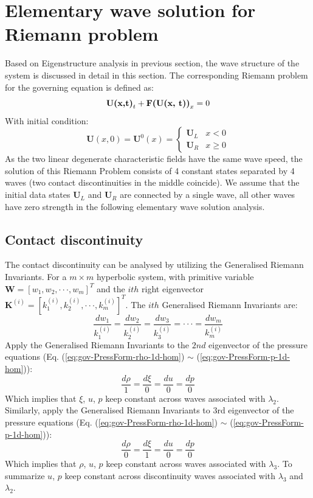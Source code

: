 \section{Elementary wave solution for Riemann problem}
Based on Eigenstructure analysis in previous section, the wave structure of the system is discussed in detail in this section. 
The corresponding Riemann problem for the governing equation is defined as: 
\begin{equation}
\textbf{U(x,t)}_t + \textbf{F(\textbf{U}(x, t))}_x = 0
\end{equation}
With initial condition: 
\begin{equation}
\textbf{U}(x, 0) = \textbf{U}^0(x) = \begin{cases} 
      \textbf{U}_L & x< 0\\
      \textbf{U}_R & x\geq 0
\end{cases}
\end{equation}
As the two linear degenerate characteristic fields have the same wave speed, the solution of this Riemann Problem consists of 4 constant states separated by 4 waves (two contact discontinuities in the middle coincide). 
We assume that the initial data states $\textbf{U}_L$ and $\textbf{U}_R$ are connected by a single wave, all other waves have zero strength in the following elementary wave solution analysis.

\subsection{Contact discontinuity}
The contact discontinuity can be analysed by utilizing the Generalised Riemann Invariants. For a $m \times m$ hyperbolic system, with primitive variable $\textbf{W} = \left[ w_1, w_2, \cdot \cdot \cdot , w_m \right]^T$ and the $ith$ right eigenvector $\textbf{K}^{(i)}=[k^{(i)}_1,k^{(i)}_2, \cdot\cdot\cdot, k^{(i)}_m]^T$. The $ith$ Generalised Riemann Invariants \citep{jeffreyquasilinear} are: 
\begin{equation}
\frac{dw_1}{k^{(i)}_1}=\frac{dw_2}{k^{(i)}_2}=\frac{dw_3}{k^{(i)}_3}=\cdot\cdot\cdot=\frac{dw_m}{k^{(i)}_m}
\label{eq:Generalised-Riemann-Invariants}
\end{equation}
Apply the Generalised Riemann Invariants to the $2nd$ eigenvector of the pressure equations (Eq. (\ref{eq:gov-PressForm-rho-1d-hom}) $\sim$ (\ref{eq:gov-PressForm-p-1d-hom})): 
\begin{equation}
\frac{d \rho}{1}=\frac{d \xi}{0} = \frac{d u}{0} = \frac{d p}{0}
\end{equation}
Which implies that $\xi$, $u$, $p$ keep constant across waves associated with $\lambda_2$. 
Similarly, apply the Generalised Riemann Invariants to 3rd eigenvector of the pressure equations (Eq. (\ref{eq:gov-PressForm-rho-1d-hom}) $\sim$ (\ref{eq:gov-PressForm-p-1d-hom})):
\begin{equation}
\frac{d \rho}{0}=\frac{d \xi}{1} = \frac{d u}{0} = \frac{d p}{0}
\end{equation}
Which implies that $\rho$, $u$, $p$ keep constant across waves associated with $\lambda_3$.
To summarize $u$, $p$ keep constant across discontinuity waves associated with $\lambda_3$ and $\lambda_2$.

